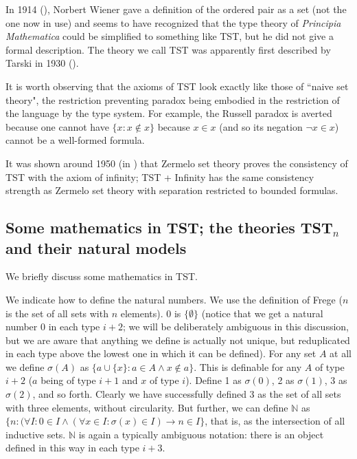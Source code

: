\documentclass[112pt]{article}
\begin{document}
In 1914 (\cite{wiener}), Norbert Wiener gave a definition of the ordered pair as a set (not the one now in use) and seems to have recognized that the type theory of {\em Principia Mathematica\/} could be simplified to something like TST, but he did not give a formal description.  The theory we call TST was apparently first described by Tarski in 1930 (\cite{tarskiontst}).

It is worth observing that the axioms of TST look exactly like those of ``naive set theory", the restriction preventing paradox being embodied in the restriction of the language by the type system.
For example, the Russell paradox is averted because one cannot have $\{x:x \not\in x\}$ because $x \in x$ (and so its negation $\neg x \in x$) cannot be a well-formed formula.

It was shown around 1950 (in \cite{kemeny}) that Zermelo set theory proves the consistency of TST with the axiom of infinity;  TST + Infinity has the same consistency strength as
Zermelo set theory with separation restricted to bounded formulas.


\newpage

\subsection{Some mathematics in TST;  the theories TST$_n$ and their natural models}

We briefly discuss some mathematics in TST.

We indicate how to define the natural numbers.  We use the definition of Frege ($n$ is the set of all sets with $n$ elements).  0 is $\{\emptyset\}$ (notice that we get a natural number 0 in each type $i+2$;  we will be deliberately ambiguous in this discussion, but we are aware that anything we define is actually not unique, but reduplicated in each type above the lowest one in which it can be defined).  For any set $A$ at all we define $\sigma(A)$ as $\{a \cup \{x\}:a \in A \wedge x \not\in a\}$.  This is definable for any $A$ of type $i+2$ ($a$ being of type $i+1$ and $x$ of type $i$).  Define 1 as $\sigma(0)$, 2 as $\sigma(1)$,  3 as $\sigma(2)$, and so forth.  Clearly we have successfully defined 3 as the set of all sets with three elements, without circularity.
But further, we can define $\mathbb N$ as $\{n:(\forall I:0 \in I \wedge (\forall x \in I:\sigma(x) \in I) \rightarrow n \in I\}$, that is, as the intersection of all inductive sets.
$\mathbb N$ is again a typically ambiguous notation:  there is an object defined in this way in each type $i+3$.
\end{document}

